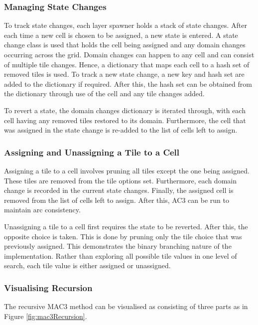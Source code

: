 \subsubsection{Managing State Changes}
To track state changes, each layer spawner holds a stack of state changes. After each time a new cell is chosen to be assigned, a new state is entered. A state change class is used that holds the cell being assigned and any domain changes occurring across the grid. Domain changes can happen to any cell and can consist of multiple tile changes. Hence, a dictionary that maps each cell to a hash set of removed tiles is used. To track a new state change, a new key and hash set are added to the dictionary if required. After this, the hash set can be obtained from the dictionary through use of the cell and any tile changes added.


To revert a state, the domain changes dictionary is iterated through, with each cell having any removed tiles restored to its domain. Furthermore, the cell that was assigned in the state change is re-added to the list of cells left to assign.

\subsubsection{Assigning and Unassigning a Tile to a Cell}
Assigning a tile to a cell involves pruning all tiles except the one being assigned. These tiles are removed from the tile options set. Furthermore, each domain change is recorded in the current state changes. Finally, the assigned cell is removed from the list of cells left to assign. After this, AC3 can be run to maintain arc consistency.


Unassigning a tile to a cell first requires the state to be reverted. After this, the opposite choice is taken. This is done by pruning only the tile choice that was previously assigned. This demonstrates the binary branching nature of the implementation. Rather than exploring all possible tile values in one level of search, each tile value is either assigned or unassigned.

\subsubsection{Visualising Recursion}
The recursive MAC3 method can be visualised as consisting of three parts as in Figure \ref{fig:mac3Recursion}.

